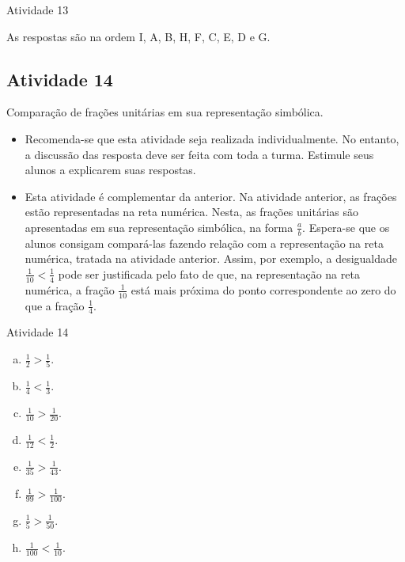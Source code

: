 \begin{multicols}{2}
\begin{itemize}
  \end{itemize}
  

\begin{resposta*}{Atividade 13}

As respostas são na ordem I, A, B, H, F, C, E, D e G. 

\end{resposta*}

\subsection{Atividade 14}

  Comparação de frações unitárias em sua representação simbólica.

\begin{itemize}
 \item  Recomenda-se que esta atividade seja realizada individualmente. No entanto, a discussão das resposta deve ser feita com toda a turma. Estimule seus alunos a explicarem suas respostas.
 \item  Esta atividade é complementar da anterior. Na atividade anterior, as frações estão representadas na reta numérica. Nesta, as frações unitárias são apresentadas em sua representação simbólica, na forma $\frac{a}{b}$. Espera-se que os alunos consigam compará-las fazendo relação com a representação na reta numérica, tratada na atividade anterior. Assim, por exemplo, a desigualdade $\frac{1}{10} < \frac{1}{4}$ pode ser justificada pelo fato de que, na representação na reta numérica, a fração $\frac{1}{10}$ está mais próxima do ponto correspondente ao zero do que a fração $\frac{1}{4}$. 
\end{itemize}

\begin{resposta*}{Atividade 14}
\begin{enumerate}[a)]
 \item $\frac{1}{2}>\frac{1}{5}$.
\item $\frac{1}{4}<\frac{1}{3}$.  
\item $\frac{1}{10}>\frac{1}{20}$. 
\item $\frac{1}{12}<\frac{1}{2}$.
\item $\frac{1}{35}>\frac{1}{43}$.
\item  $\frac{1}{99}>\frac{1}{100}$.
\item  $\frac{1}{5}>\frac{1}{50}$.
\item  $\frac{1}{100}<\frac{1}{10}$.
\end{enumerate}
 

\end{resposta*}
\end{multicols}
